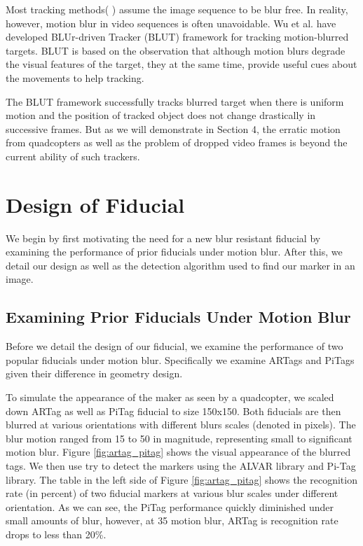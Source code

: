 \documentclass[runningheads]{llncs}
\begin{document}
Most tracking methods( \cite{Ross:2008,Wu:2009,Perez02,Mei:2009} ) assume the
image sequence to be blur free. In reality, however, motion blur in video
sequences is often unavoidable. Wu et al.\cite{Wu:2011} have developed
BLUr-driven Tracker (BLUT) framework for tracking motion-blurred targets. BLUT
is based on the observation that although motion blurs degrade the visual
features of the target, they at the same time, provide useful cues about the
movements to help tracking.

The BLUT framework successfully tracks blurred target when there is uniform motion
and the position of tracked object does not change drastically in successive
frames. But as we will demonstrate in Section 4, the erratic motion from quadcopters as 
well as the problem of dropped video frames is beyond the current ability of such trackers.

\section{Design of Fiducial}

We begin by first motivating the need for a new blur resistant fiducial by examining
the performance of prior fiducials under motion blur.  After this, we detail
our design as well as the detection algorithm used to find our marker in an image.

\subsection{Examining Prior Fiducials Under Motion Blur}

Before we detail the design of our fiducial, we examine the performance of two
popular fiducials under motion blur.  Specifically we examine ARTags
\cite{Fiala05} and PiTags\cite{Pitag13} given their difference in geometry design.

To simulate the appearance of the maker as seen by a quadcopter,  we scaled down
ARTag as well as PiTag fiducial to size 150x150. Both fiducials are then blurred
at various orientations with different blurs scales (denoted in pixels).   The
blur motion ranged from 15 to 50 in magnitude, representing small to significant
motion blur. Figure \ref{fig:artag_pitag} shows the visual appearance of the
blurred tags. We then use try to detect the markers using the ALVAR
library\cite{alvar} and Pi-Tag library\cite{ros_pitag}.
The table in the left side of Figure
\ref{fig:artag_pitag} shows the recognition rate (in percent) of two fiducial
markers at various blur scales under different orientation.   As we can see,
the PiTag performance quickly diminished under small amounts of blur, however,
at 35 motion blur, ARTag is recognition rate drops to less than 20\%.
\end{document}

